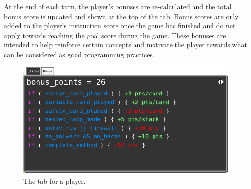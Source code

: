 At the end of each turn, the player's bonuses are re-calculated and the total bonus score is updated and shown at the top of the \Bns tab. Bonus scores are only added to the player's instruction score once the game has finished and do not apply towards reaching the goal score during the game. These bonuses are intended to help reinforce certain concepts and motivate the player towards what can be considered as good programming practices.

\begin{figure}[ht]
	\centering
	\includegraphics[width=\columnwidth]{images/objectives.PNG}
	\caption{The \Bns tab for a player.}
	\label{fig:bonus}
\end{figure}
